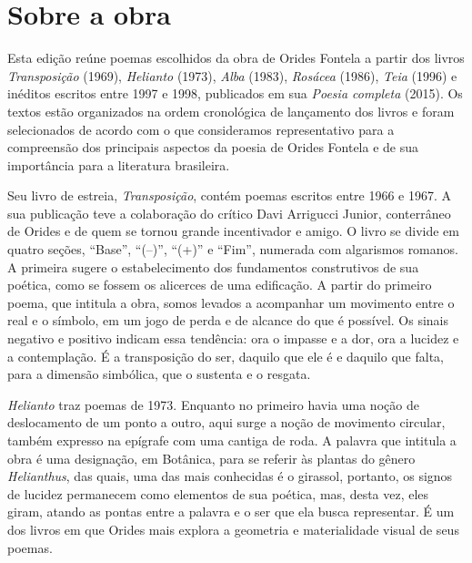 \pagebreak

\section{Sobre a obra}

Esta edição reúne poemas escolhidos da obra de Orides Fontela a partir
dos livros \emph{Transposição} (1969), \emph{Helianto} (1973),
\emph{Alba} (1983), \emph{Rosácea} (1986), \emph{Teia} (1996) e inéditos
escritos entre 1997 e 1998, publicados em sua \emph{Poesia completa}
(2015). Os textos estão organizados na ordem cronológica de lançamento
dos livros e foram selecionados de acordo com o que consideramos
representativo para a compreensão dos principais aspectos da poesia de
Orides Fontela e de sua importância para a literatura brasileira.

Seu livro de estreia, \emph{Transposição}, contém poemas escritos entre
1966 e 1967. A sua publicação teve a colaboração do crítico Davi
Arrigucci Junior, conterrâneo de Orides e de quem se tornou grande
incentivador e amigo. O livro se divide em quatro seções, ``Base'',
``(--)'', ``(+)'' e ``Fim'', numerada com algarismos romanos. A primeira
sugere o estabelecimento dos fundamentos construtivos de sua poética,
como se fossem os alicerces de uma edificação. A partir do primeiro
poema, que intitula a obra, somos levados a acompanhar um movimento
entre o real e o símbolo, em um jogo de perda e de alcance do que é
possível. Os sinais negativo e positivo indicam essa tendência: ora o
impasse e a dor, ora a lucidez e a contemplação. É a transposição do
ser, daquilo que ele é e daquilo que falta, para a dimensão simbólica,
que o sustenta e o resgata.

\emph{Helianto} traz poemas de 1973. Enquanto no primeiro havia uma
noção de deslocamento de um ponto a outro, aqui surge a noção de
movimento circular, também expresso na epígrafe com uma cantiga de roda.
A palavra que intitula a obra é uma designação, em Botânica, para se
referir às plantas do gênero \emph{Helianthus}, das quais, uma das mais
conhecidas é o girassol, portanto, os signos de lucidez permanecem como
elementos de sua poética, mas, desta vez, eles giram, atando as pontas
entre a palavra e o ser que ela busca representar. É um dos livros em
que Orides mais explora a geometria e materialidade visual de seus
poemas.

